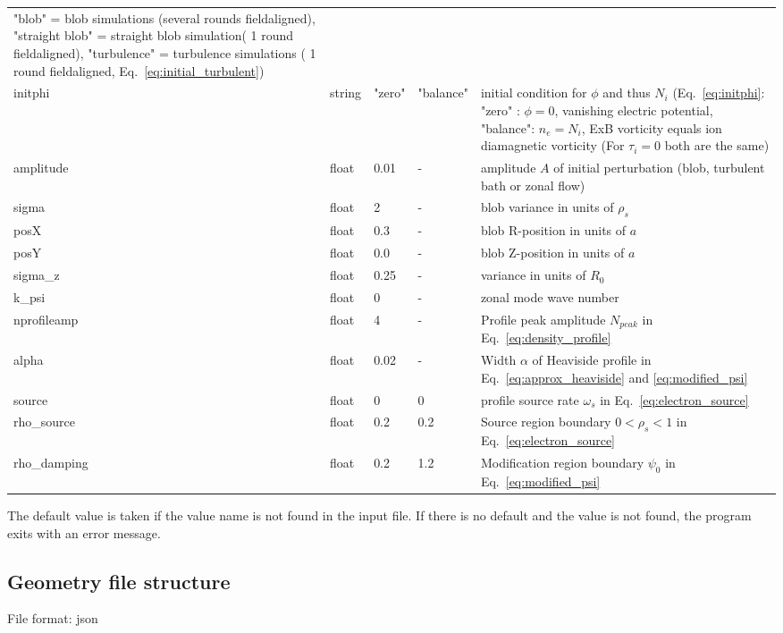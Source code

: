 \begin{longtable}{llll>{\RaggedRight}p{6cm}}
    "blob" = blob simulations (several rounds fieldaligned),
    "straight blob" = straight blob simulation( 1 round fieldaligned),
    "turbulence" = turbulence simulations ( 1 round fieldaligned, Eq.~\eqref{eq:initial_turbulent})\\
initphi   & string & "zero"  & "balance" & initial condition for $\phi$ and thus $N_i$ (Eq.~\eqref{eq:initphi}: "zero" : $\phi = 0$, vanishing
electric potential, "balance": $n_e=N_i$, ExB vorticity equals ion diamagnetic vorticity (For $\tau_i =0 $ both are the same)
\\
amplitude  & float &0.01   & - & amplitude $A$ of initial perturbation (blob, turbulent bath or zonal flow)  \\
sigma      & float &2      & - & blob variance in units of $\rho_s$ \\
posX       & float &0.3    & - & blob R-position in units of $a$\\
posY       & float &0.0    & - & blob Z-position in units of $a$ \\
sigma\_z    & float &0.25   & - & variance in units of $R_0$  \\
k\_psi     & float &0    & - & zonal mode wave number  \\
nprofileamp& float &4   & - & Profile peak amplitude $N_{peak}$ in Eq.~\eqref{eq:density_profile} \\
alpha       & float & 0.02 & - & Width $\alpha$ of Heaviside profile in Eq.~\eqref{eq:approx_heaviside} and \eqref{eq:modified_psi} \\
source      & float & 0    & 0 & profile source rate $\omega_s$ in Eq.~\eqref{eq:electron_source} \\
rho\_source & float & 0.2  & 0.2 & Source region boundary $0<\rho_{s}<1$ in Eq.~\eqref{eq:electron_source}  \\
rho\_damping& float & 0.2  & 1.2 & Modification region boundary $\psi_0$ in Eq.~\eqref{eq:modified_psi}  \\
\bottomrule
\end{longtable}
The default value is taken if the value name is not found in the input file. If there is no default and
the value is not found,
the program exits with an error message.
\subsection{Geometry file structure} \label{sec:geometry_file}
File format: json

